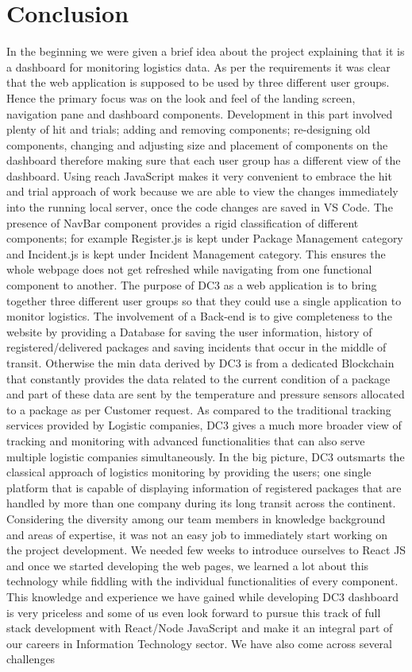 \chapter{Conclusion}
\label{cha:conclusion}

In the beginning we were given a brief idea about the project explaining that it is a dashboard for monitoring logistics data. As per the requirements it was clear that the web application is supposed to be used by three different user groups. Hence the primary focus was on the look and feel of the landing screen, navigation pane and dashboard components. Development in this part involved plenty of hit and trials; adding and removing components; re-designing old components, changing and adjusting size and placement of components on the dashboard therefore making sure that each user group has a different view of the dashboard. Using reach JavaScript makes it very convenient to embrace the hit and trial approach of work because we are able to view the changes immediately into the running local server, once the code changes are saved in VS Code. The presence of NavBar component provides a rigid classification of different components; for example Register.js is kept under Package Management category and Incident.js is kept under Incident Management category. This ensures the whole webpage does not get refreshed while navigating from one functional component to another. The purpose of DC3 as a web application is to bring together three different user groups so that they could use a single application to monitor logistics. The involvement of a Back-end is to give completeness to the website by providing a Database for saving the user information, history of registered/delivered packages and saving incidents that occur in the middle of transit. Otherwise the min data derived by DC3 is from a dedicated Blockchain that constantly provides the data related to the current condition of a package and part of these data are sent by the temperature and pressure sensors allocated to a package as per Customer request. As compared to the traditional tracking services provided by Logistic companies, DC3 gives a much more broader view of tracking and monitoring with advanced functionalities that can also serve multiple logistic companies simultaneously. In the big picture, DC3 outsmarts the classical approach of logistics monitoring by providing the users; one single platform that is capable of displaying information of registered packages that are handled by more than one company during its long transit across the continent. Considering the diversity among our team members in knowledge background and areas of expertise, it was not an easy job to immediately start working on the project development. We needed few weeks to introduce ourselves to React JS and once we started developing the web pages, we learned a lot about this technology while fiddling with the individual functionalities of every component. This knowledge and experience we have gained while developing DC3 dashboard is very priceless and some of us even look forward to pursue this track of full stack development with React/Node JavaScript and make it an integral part of our careers in Information Technology sector. We have also come across several challenges 
